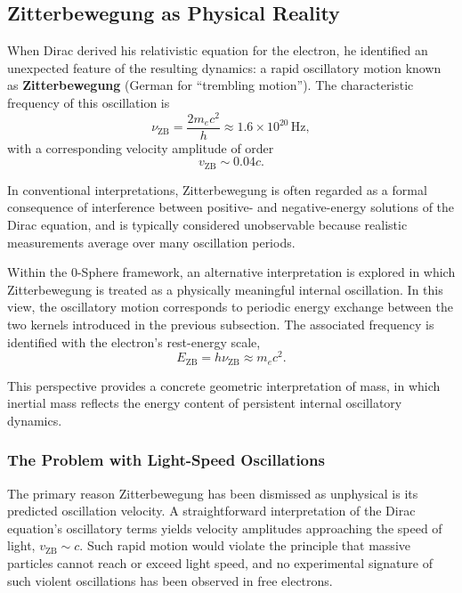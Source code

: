 \documentclass[12pt,letterpaper]{article}
\begin{document}
\subsection{Zitterbewegung as Physical Reality}
\label{subsec:zitterbewegung}

When Dirac derived his relativistic equation for the electron, he identified an unexpected feature of the resulting dynamics: a rapid oscillatory motion known as \textbf{Zitterbewegung} (German for ``trembling motion''). The characteristic frequency of this oscillation is
\begin{equation}
\nu_{\mathrm{ZB}} = \frac{2 m_e c^2}{h} \approx 1.6 \times 10^{20} \, \mathrm{Hz},
\end{equation}
with a corresponding velocity amplitude of order
\begin{equation}
v_{\mathrm{ZB}} \sim 0.04c.
\end{equation}

In conventional interpretations, Zitterbewegung is often regarded as a formal consequence of interference between positive- and negative-energy solutions of the Dirac equation, and is typically considered unobservable because realistic measurements average over many oscillation periods.

Within the 0-Sphere framework, an alternative interpretation is explored in which Zitterbewegung is treated as a physically meaningful internal oscillation. In this view, the oscillatory motion corresponds to periodic energy exchange between the two kernels introduced in the previous subsection. The associated frequency is identified with the electron's rest-energy scale,
\begin{equation}
E_{\mathrm{ZB}} = h \nu_{\mathrm{ZB}} \approx m_e c^2.
\end{equation}

This perspective provides a concrete geometric interpretation of mass, in which inertial mass reflects the energy content of persistent internal oscillatory dynamics.

\subsubsection{The Problem with Light-Speed Oscillations}
\label{subsubsec:lightspeed_problem}

The primary reason Zitterbewegung has been dismissed as unphysical is its predicted oscillation velocity. A straightforward interpretation of the Dirac equation's oscillatory terms yields velocity amplitudes approaching the speed of light, $v_{\mathrm{ZB}} \sim c$. Such rapid motion would violate the principle that massive particles cannot reach or exceed light speed, and no experimental signature of such violent oscillations has been observed in free electrons.
\end{document}
